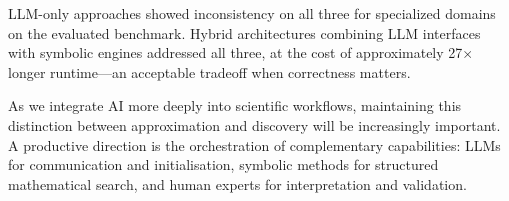 \documentclass[11pt,a4paper]{article}
\begin{document}
LLM-only approaches showed inconsistency on all three for specialized domains on the evaluated benchmark. Hybrid architectures combining LLM interfaces with symbolic engines addressed all three, at the cost of approximately 27$\times$ longer runtime---an acceptable tradeoff when correctness matters.

As we integrate AI more deeply into scientific workflows, maintaining this distinction between approximation and discovery will be increasingly important. A productive direction is the orchestration of complementary capabilities: LLMs for communication and initialisation, symbolic methods for structured mathematical search, and human experts for interpretation and validation.








\end{document}
